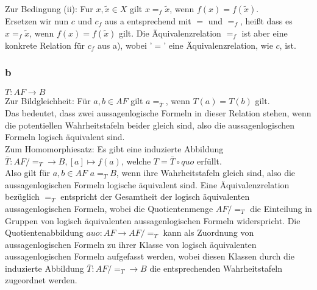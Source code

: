 \documentclass[a4paper,graphics,11pt]{article}
\newcommand\aufgabenteil[1]{\subsubsection*{#1}}
\begin{document}
Zur Bedingung (ii): Fur $x,\tilde{x} \in X$ gilt $x=_{f} \tilde{x}$, wenn $f(x)=f(\tilde{x})$.\\
Ersetzen wir nun $c$ und $c_{f}$ aus a entsprechend mit $=$ und $=_{f}$, hei{\ss}t dass es $x=_{f} \tilde{x}$, wenn $f(x)=f(\tilde{x})$ gilt. Die {\"A}quivalenzrelation $=_{f}$ ist aber eine konkrete Relation f{\"u}r $c_{f}$ aus a), wobei '$=$' eine {\"A}quivalenzrelation, wie $c$, ist.
\aufgabenteil{b}
$T:AF \to B$\\
Zur Bildgleichheit: F{\"u}r $a,b \in AF$ gilt $a=_{\bar{T}}$, wenn $T(a)=T(b)$ gilt.\\
Das bedeutet, dass zwei aussagenlogische Formeln in dieser Relation stehen, wenn die potentiellen Wahrheitstafeln beider gleich sind, also die aussagenlogischen Formeln logisch {\"a}quivalent sind.\\
Zum Homomorphiesatz: Es gibt eine induzierte Abbildung $\bar{T}: AF/=_{T} \to B, [a] \mapsto f(a)$, welche $T=\bar{T} \circ quo$ erf{\"u}llt.\\
Also gilt f{\"u}r $a,b \in AF$ $a=_{T}B$, wenn ihre Wahrheitstafeln gleich sind, also die aussagenlogischen Formeln logische {\"a}quivalent sind. Eine {\"A}quivalenzrelation bez{\"u}glich $=_{T}$ entspricht der Gesamtheit der logisch {\"a}quivalenten aussagenlogischen Formeln, wobei die Quotientenmenge $AF/=_{T}$ die Einteilung in Gruppen von logisch {\"a}quivalenten aussagenlogischen Formeln widerspricht. Die Quotientenabbildung $auo: AF \to AF/=_{T}$ kann als Zuordnung von aussagenlogischen Formeln zu ihrer Klasse von logisch {\"a}quivalenten aussagenlogischen Formeln aufgefasst werden, wobei diesen Klassen durch die induzierte Abbildung $\bar{T}:AF/=_{T} \to B$ die entsprechenden Wahrheitstafeln zugeordnet werden.
\end{document}
